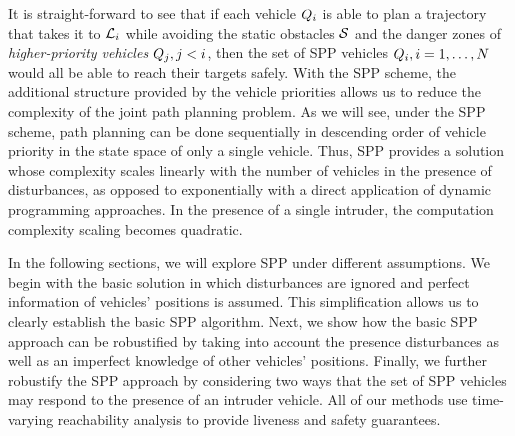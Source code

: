 It is straight-forward to see that if each vehicle $Q_i$ is able to plan a trajectory that takes it to $\mathcal{L}_i$ while avoiding the static obstacles $\mathcal{S}$ and the danger zones of \textit{higher-priority vehicles} $Q_j, j<i$, then the set of SPP vehicles $Q_i, i=1,\ldots,N$ would all be able to reach their targets safely. With the SPP scheme, the additional structure provided by the vehicle priorities allows us to reduce the complexity of the joint path planning problem. As we will see, under the SPP scheme, path planning can be done sequentially in descending order of vehicle priority in the state space of only a single vehicle. Thus, SPP provides a solution whose complexity scales linearly with the number of vehicles in the presence of disturbances, as opposed to exponentially with a direct application of dynamic programming approaches. In the presence of a single intruder, the computation complexity scaling becomes quadratic.

In the following sections, we will explore SPP under different assumptions. We begin with the basic solution in which disturbances are ignored and perfect information of vehicles' positions is assumed. This simplification allows us to clearly establish the basic SPP algorithm. Next, we show how the basic SPP approach can be robustified by taking into account the presence disturbances as well as an imperfect knowledge of other vehicles' positions. Finally, we further robustify the SPP approach by considering two ways that the set of SPP vehicles may respond to the presence of an intruder vehicle. All of our methods use time-varying reachability analysis to provide liveness and safety guarantees.